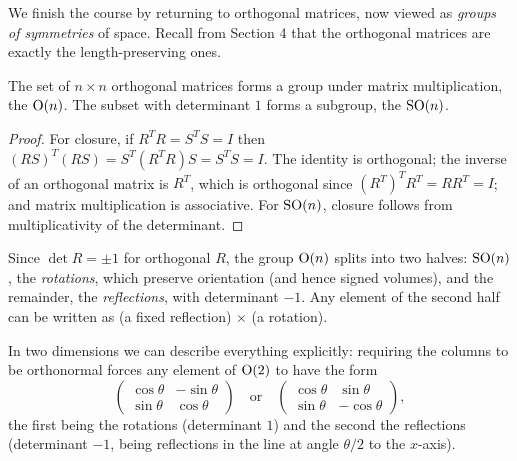 \documentclass[a4paper]{scrartcl}
\begin{document}
We finish the course by returning to orthogonal matrices, now viewed as \emph{groups of symmetries} of space. Recall from Section 4 that the orthogonal matrices are exactly the length-preserving ones.

\begin{proposition}
	The set of $n \times n$ orthogonal matrices forms a group under matrix multiplication, the  $\operatorname{O}(n)$. The subset with determinant $1$ forms a subgroup, the  $\operatorname{SO}(n)$.
\end{proposition}
\begin{proof}
	For closure, if $R^TR = S^TS = I$ then $(RS)^T(RS) = S^T(R^TR)S = S^TS = I$. The identity is orthogonal; the inverse of an orthogonal matrix is $R^T$, which is orthogonal since $(R^T)^TR^T = RR^T = I$; and matrix multiplication is associative. For $\operatorname{SO}(n)$, closure follows from multiplicativity of the determinant.
\end{proof}

Since $\det R = \pm 1$ for orthogonal $R$, the group $\operatorname{O}(n)$ splits into two halves: $\operatorname{SO}(n)$, the \emph{rotations}, which preserve orientation (and hence signed volumes), and the remainder, the \emph{reflections}, with determinant $-1$. Any element of the second half can be written as (a fixed reflection) $\times$ (a rotation).

In two dimensions we can describe everything explicitly: requiring the columns to be orthonormal forces any element of $\operatorname{O}(2)$ to have the form
$$
\begin{pmatrix}
	\cos\theta & -\sin\theta \\
	\sin\theta & \cos\theta
\end{pmatrix}
\quad \text{or} \quad
\begin{pmatrix}
	\cos\theta & \sin\theta \\
	\sin\theta & -\cos\theta
\end{pmatrix},
$$
the first being the rotations (determinant $1$) and the second the reflections (determinant $-1$, being reflections in the line at angle $\theta/2$ to the $x$-axis).

\begin{center}
\end{center}
\end{document}
